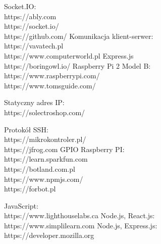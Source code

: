 \begin{thebibliography}{1}
 Socket.IO:
\\
 https://ably.com
\\
https://socket.io/
\\
https://github.com/
Komunikacja klient-serwer:
\\
 https://vavatech.pl
\\
https://www.computerworld.pl
 Express.js
\\ 
https://boringowl.io/
Raspberry Pi 2 Model B:
\\
https://www.raspberrypi.com/
\\
https://www.tomsguide.com/

 Statyczny adres IP:
\\
https://solectroshop.com/

 Protokół SSH:
\\
https://mikrokontroler.pl/
\\
https://jfrog.com
 GPIO Raspberry PI:
\\
https://learn.sparkfun.com
\\
https://botland.com.pl
\\
https://www.npmjs.com/
\\
https://forbot.pl

 JavaScript:
\\
https://www.lighthouselabs.ca
Node.js, React.js:
\\
https://www.simplilearn.com
Node.js, Express.js:
\\
https://developer.mozilla.org

\end{thebibliography}


